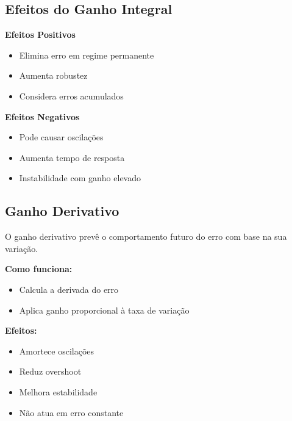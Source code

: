 \documentclass[journal]{IEEEtran}
\begin{document}
\subsection{Efeitos do Ganho Integral}
\textbf{Efeitos Positivos}
\begin{itemize}
    \item Elimina erro em regime permanente
    \item Aumenta robustez
    \item Considera erros acumulados
\end{itemize}

\textbf{Efeitos Negativos}
\begin{itemize}
    \item Pode causar oscilações
    \item Aumenta tempo de resposta
    \item Instabilidade com ganho elevado
\end{itemize}

\subsection{Ganho Derivativo}

O ganho derivativo prevê o comportamento futuro do erro com base na sua variação.

\textbf{Como funciona:}
\begin{itemize}
    \item Calcula a derivada do erro
    \item Aplica ganho proporcional à taxa de variação
\end{itemize}

\textbf{Efeitos:}
\begin{itemize}
    \item Amortece oscilações
    \item Reduz overshoot
    \item Melhora estabilidade
    \item Não atua em erro constante
\end{itemize}
\end{document}

